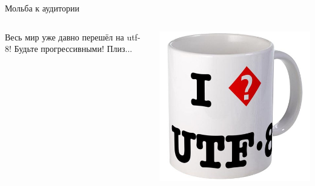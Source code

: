 \documentclass[aspectratio=169]{beamer} %
\begin{document}
\begin{frame}{Мольба к аудитории}
\begin{columns}
\begin{column}{.66\linewidth}
\Large Весь мир уже давно перешёл на utf-8! Будьте прогрессивными! Плиз... 
\end{column}
\begin{column}{.33\linewidth}
\hfill \includegraphics[width=\linewidth]{cuputf8.jpg}	
\end{column}
\end{columns}
\end{frame}
\end{document}
